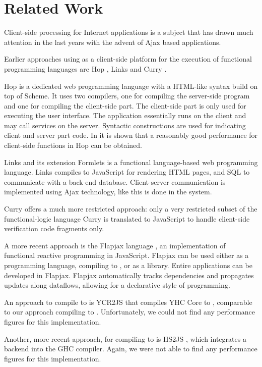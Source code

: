 \section{Related Work}\label{sapljs:sec:related}
Client-side processing for Internet applications is a subject that has drawn much attention in the last years with the advent of \textsf{Ajax} based
applications.%

Earlier approaches using \JS as a client-side platform for the execution of functional programming languages are \textsf{Hop} \cite{HOP1,HOP2},
\textsf{Links} \cite{LINKS1} and \textsf{Curry}  \cite{CURRY}. 

\textsf{Hop} is a dedicated web programming language with a \textsf{HTML}-like syntax build on top of \textsf{Scheme}. 
It uses two compilers, one for compiling the server-side program and one for compiling the client-side part. 
The client-side part is only used for executing the user interface. 
The application essentially runs on the client and may call services on the server.
Syntactic constructions are used
for indicating client and server part code.
In \cite{HOP2} it is shown that a reasonably good performance for client-side functions in \textsf{Hop} can be obtained. 

\textsf{Links} \cite{LINKS1} and its extension \textsf{Formlets}  is a functional language-based web programming language. 
\textsf{Links} compiles to \textsf{JavaScript} for rendering \textsf{HTML} pages, and \textsf{SQL} to communicate with a back-end database.
Client-server communication is implemented using \textsf{Ajax} technology, 
like this is done in the \iTask system. 

 \textsf{Curry} offers a much more restricted approach:
 only a very restricted subset of the functional-logic language \textsf{Curry} 
is translated to \textsf{JavaScript} to handle client-side verification code fragments only.

A more recent approach is the \textsf{Flapjax} language \cite{FLAPJAX}, 
an implementation of functional reactive programming in \textsf{JavaScript}.
\textsf{Flapjax} can be used either as a programming language, 
compiling to \JS, or as a \JS library. 
Entire applications can be developed in \textsf{Flapjax}.  
\textsf{Flapjax} automatically tracks dependencies and propagates updates along 
dataflows, allowing for a declarative style of programming.

An approach to compile \Haskell to \JS is \textsf{YCR2JS} \cite{YHC2JS} that compiles \textsf{YHC Core} to \JS, 
comparable to our approach compiling \Sapl to \JS. Unfortunately, we could not find any performance figures for this implementation.

Another, more recent approach, for compiling \Haskell to \JS is \textsf{HS2JS} \cite{HS2JS}, which integrates a \JS backend into the \textsf{GHC} compiler. 
Again, we were not able to find any performance figures for this implementation.


